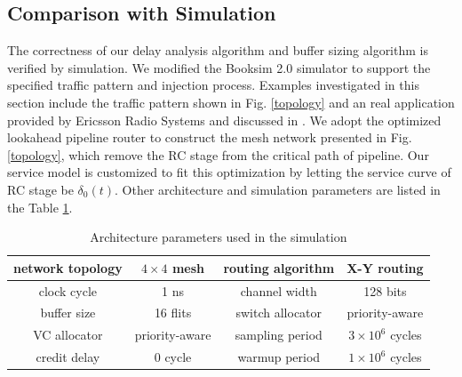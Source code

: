 \documentclass[preprint]{elsarticle}
\begin{document}
\subsection{Comparison with Simulation}\label{sim}
The correctness of our delay analysis algorithm and buffer sizing algorithm is verified by simulation. We modified the Booksim 2.0 simulator \cite{6557149} to support the specified traffic pattern and injection process. Examples investigated in this section include the traffic pattern shown in Fig. \ref{topology} and an real application provided by Ericsson Radio Systems and discussed in \cite{LuJa08}\cite{Jafari1922089}. We adopt the optimized lookahead pipeline router  \cite{jerger2009chip} to construct the mesh network presented in Fig. \ref{topology}, which remove the RC stage from the critical path of pipeline. Our service model is customized to fit this optimization by letting the service curve of RC stage be $\delta_0(t)$. Other architecture and simulation parameters are listed in the Table \ref{arcpara}.
\begin{table}[htbp]
\centering
\caption{\label{arcpara}Architecture parameters used in the simulation}
\begin{tabular}{|c|c||c|c|}
\hline
network topology    & $4\times 4$ mesh  &   routing algorithm & X-Y routing\\
\hline
clock cycle   & 1 ns &   channel width   & 128 bits\\
\hline
buffer size &   16 flits  &   switch allocator    &   priority-aware\\
\hline
VC allocator    &   priority-aware    & sampling period &   $3\times 10^6$ cycles\\
\hline
credit delay &  0 cycle   &  warmup period  & $1\times 10^6$ cycles \\
\hline
\end{tabular}
\end{table}
\end{document}

